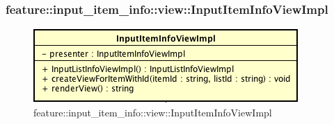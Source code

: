 \subsubsection{feature::input\_item\_info::view::InputItemInfoViewImpl}

\label{feature::input_item_info::view::InputItemInfoViewImpl}
\begin{figure}[ht]
	\centering
	\includegraphics[scale=0.5]{Sezioni/SottosezioniST/img/app/InputItemInfoViewImpl.png}
	\caption{feature::input\_item\_info::view::InputItemInfoViewImpl}
\end{figure}

